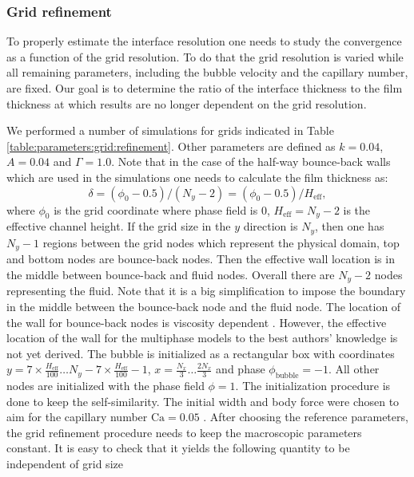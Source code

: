 \documentclass{CFD2011}
\newcommand{\Ca}{\mathrm{Ca}}
\begin{document}
\subsubsection{Grid refinement}
To properly estimate the interface resolution one needs to study the convergence as a function of
the grid resolution. To do that the grid resolution is varied while all remaining parameters,
including the bubble velocity and the capillary number, are fixed.  Our goal is to determine the 
ratio of the interface thickness to the 
film thickness at which results are no longer dependent on the grid resolution.


We performed a number of simulations for grids indicated in
Table \ref{table:parameters:grid:refinement}. Other parameters are defined as $k=0.04$, $A=0.04$ and
$\Gamma=1.0$. Note that in the case of the half-way bounce-back walls \cite{yu} which are used in
the
simulations one needs to calculate the film thickness as:
\begin{equation}
\delta=(\phi_0-0.5)/(N_y-2)=(\phi_0-0.5)/H_{\mathrm{eff}},
\end{equation}
where $\phi_0$ is the grid coordinate where phase field is $0$, $H_{\mathrm{eff}}=N_y-2$
is the effective channel height.
If the grid size in the $y$ direction is $N_y$, then one has $N_y-1$ regions between the grid nodes
which represent
the physical domain, top and bottom nodes are bounce-back nodes. Then the effective wall location is
in the middle between bounce-back and fluid
nodes. Overall there are $N_y-2$ nodes representing the fluid. Note that it is a big
simplification to impose the boundary in the middle between the bounce-back
node and the fluid node. The location of the wall for bounce-back nodes is
viscosity dependent \cite{ginzburg-multireflection}.  However, the effective location of the
wall for the
multiphase models to the best authors' knowledge is not yet derived.
The bubble is initialized as a rectangular box with coordinates
$y=7\times\frac{H_\mathrm{eff}}{100}\dots N_y-7\times\frac{H_\mathrm{eff}}{100}-1$,
$x=\frac{N_x}{3}\dots \frac{2 N_x}{3}$ and phase
$\phi_{\mathrm{bubble}}=-1$. All other nodes are initialized with the phase field
$\phi=1$. The initialization procedure is done to keep the self-similarity. The initial width and
body force were chosen to aim for the capillary number $\Ca=0.05$ \cite{kuzmin-binary2d}.
After choosing the reference parameters, the grid refinement procedure
needs to keep the macroscopic parameters constant.  It is easy to check
that it yields the following quantity to
be independent of grid size
\end{document}
